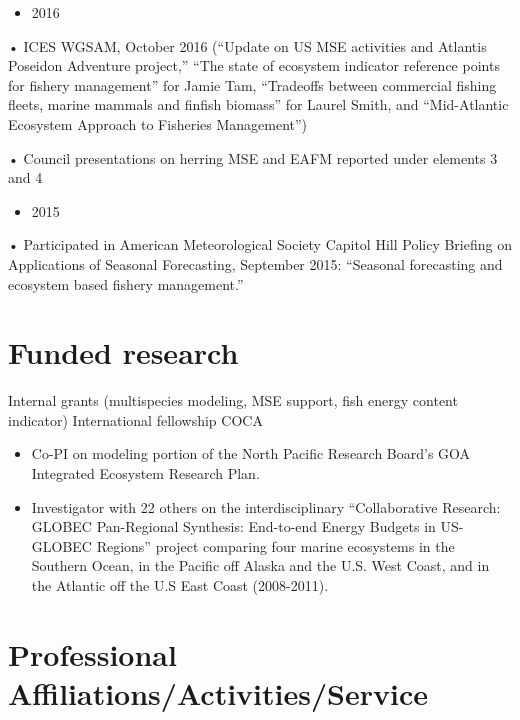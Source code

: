 \documentclass[11pt, a4paper]{awesome-cv}
\providecommand{\tightlist}{%
	\setlength{\itemsep}{0pt}\setlength{\parskip}{0pt}}
\begin{document}
\begin{itemize}
\tightlist
\item
  2016
\end{itemize}

• ICES WGSAM, October 2016 (``Update on US MSE activities and Atlantis
Poseidon Adventure project,'' ``The state of ecosystem indicator
reference points for fishery management'' for Jamie Tam, ``Tradeoffs
between commercial fishing fleets, marine mammals and finfish biomass''
for Laurel Smith, and ``Mid-Atlantic Ecosystem Approach to Fisheries
Management'')

• Council presentations on herring MSE and EAFM reported under elements
3 and 4

\begin{itemize}
\tightlist
\item
  2015
\end{itemize}

• Participated in American Meteorological Society Capitol Hill Policy
Briefing on Applications of Seasonal Forecasting, September 2015:
``Seasonal forecasting and ecosystem based fishery management.''

\hypertarget{funded-research}{%
\section{Funded research}\label{funded-research}}

Internal grants (multispecies modeling, MSE support, fish energy content
indicator) International fellowship COCA

\begin{itemize}
\tightlist
\item
  Co-PI on modeling portion of the North Pacific Research Board's GOA
  Integrated Ecosystem Research Plan.
\item
  Investigator with 22 others on the interdisciplinary ``Collaborative
  Research: GLOBEC Pan-Regional Synthesis: End-to-end Energy Budgets in
  US-GLOBEC Regions'' project comparing four marine ecosystems in the
  Southern Ocean, in the Pacific off Alaska and the U.S. West Coast, and
  in the Atlantic off the U.S East Coast (2008-2011).
\end{itemize}

\hypertarget{professional-affiliationsactivitiesservice}{%
\section{Professional
Affiliations/Activities/Service}\label{professional-affiliationsactivitiesservice}}
\end{document}
